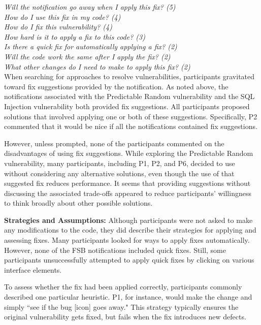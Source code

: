\documentclass[10pt,journal,compsoc]{IEEEtran}
\begin{document}
\noindent\emph{Will the notification go away when I apply this fix? (5)} \\
\emph{How do I use this fix in my code? (4)} \\
\emph{How do I fix this vulnerability? (4)} \\
\emph{How hard is it to apply a fix to this code? (3)} \\
\emph{Is there a quick fix for automatically applying a fix? (2)} \\
\emph{Will the code work the same after I apply the fix? (2)} \\
\emph{What other changes do I need to make to apply this fix? (2)} 
\\

 
When searching for approaches to resolve vulnerabilities, participants gravitated toward fix suggestions provided by the notification.
As noted above, the notifications associated with the Predictable Random vulnerability and the SQL Injection vulnerability both provided fix suggestions.
All participants proposed solutions that involved applying one or both of these suggestions. 
Specifically, P2 commented that it would be nice if all the notifications contained fix suggestions.

However, unless prompted, none of the participants commented on the disadvantages of using fix suggestions.
While exploring the Predictable Random vulnerability, many participants, including P1, P2, and P6, decided to use  without considering any alternative solutions, even though the use of that suggested fix reduces performance.
It seems that providing suggestions without discussing the associated trade-offs appeared to reduce participants' willingness to think broadly about other possible solutions. 


\textbf{Strategies and Assumptions:}
Although participants were not asked to make any modifications to the code, they did describe their strategies for applying and assessing fixes.
Many participants looked for ways to apply fixes automatically.
However, none of the FSB notifications included quick fixes.
Still, some participants unsuccessfully attempted to apply quick fixes by clicking on various interface elements.

To assess whether the fix had been applied correctly, participants commonly described one particular heuristic. P1, for instance, would make the change and simply ``see if the bug [icon] goes away." 
This strategy typically ensures the original vulnerability gets fixed, but fails when the fix introduces new defects.
\end{document}
